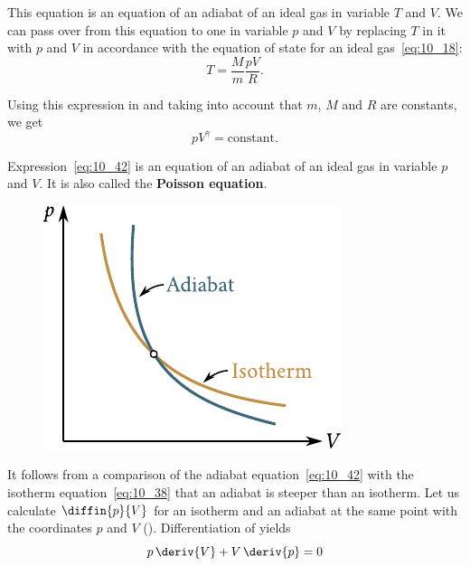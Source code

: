 This equation is an equation of an adiabat of an ideal gas in variable $T$ and $V$. We can pass over from this equation to one in variable $p$ and $V$ by replacing $T$ in it with $p$ and $V$ in accordance with the equation of state for an ideal gas~\eqref{eq:10_18}:
\begin{equation*}
	T = \frac{M}{m}\frac{pV}{R}.
\end{equation*}

\noindent
Using this expression in  and taking into account that $m$, $M$ and $R$ are constants, we get
\begin{equation}\label{eq:10_42}
	p V^{\gamma} = \text{constant}.
\end{equation}


Expression~\eqref{eq:10_42} is an equation of an adiabat of an ideal gas in variable $p$ and $V$. It is also called the \textbf{Poisson equation}.

\begin{figure}[!htb]
	\begin{center}
		\includegraphics[scale=1.0]{figures/ch_10/fig_10_6.pdf}
		\caption[]{}
		\label{fig:10_6}
	\end{center}
\end{figure}

It follows from a comparison of the adiabat equation~\eqref{eq:10_42} with the isotherm equation~\eqref{eq:10_38} that an adiabat is steeper than an isotherm. Let us calculate $\diffin{p}{V}$ for an isotherm and an adiabat at the same point with the coordinates $p$ and $V$ (). Differentiation of  yields
\begin{equation*}
	p\,\deriv{V} + V\,\deriv{p} = 0
\end{equation*}

